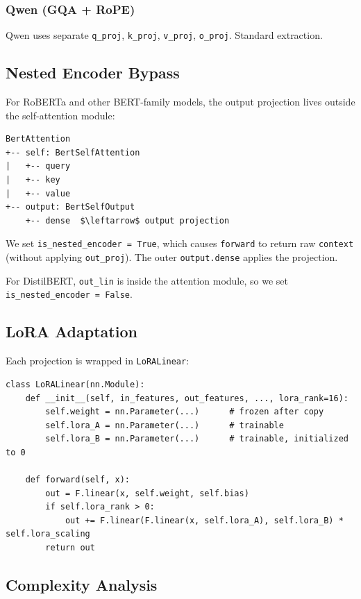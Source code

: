 \subsubsection{Qwen (GQA + RoPE)}

Qwen uses separate \texttt{q\_proj}, \texttt{k\_proj}, \texttt{v\_proj}, \texttt{o\_proj}. Standard extraction.

\subsection{Nested Encoder Bypass}

For RoBERTa and other BERT-family models, the output projection lives 
outside the self-attention module:

\begin{lstlisting}
BertAttention
+-- self: BertSelfAttention
|   +-- query
|   +-- key
|   +-- value
+-- output: BertSelfOutput
    +-- dense  $\leftarrow$ output projection
\end{lstlisting}

We set \texttt{is\_nested\_encoder = True}, which causes \texttt{forward} to return raw 
\texttt{context} (without applying \texttt{out\_proj}). The outer \texttt{output.dense} applies 
the projection.

For DistilBERT, \texttt{out\_lin} is inside the attention module, so we set 
\texttt{is\_nested\_encoder = False}.

\subsection{LoRA Adaptation}

Each projection is wrapped in \texttt{LoRALinear}:

\begin{lstlisting}
class LoRALinear(nn.Module):
    def __init__(self, in_features, out_features, ..., lora_rank=16):
        self.weight = nn.Parameter(...)      # frozen after copy
        self.lora_A = nn.Parameter(...)      # trainable
        self.lora_B = nn.Parameter(...)      # trainable, initialized to 0
    
    def forward(self, x):
        out = F.linear(x, self.weight, self.bias)
        if self.lora_rank > 0:
            out += F.linear(F.linear(x, self.lora_A), self.lora_B) * self.lora_scaling
        return out
\end{lstlisting}

\subsection{Complexity Analysis}

